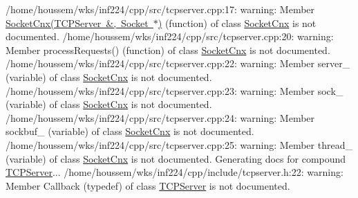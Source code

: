 /home/houssem/wks/inf224/cpp/src/tcpserver.cpp\+:17\+: warning\+: Member \mbox{\hyperlink{classSocketCnx}{Socket\+Cnx(\+TCPServer \&, Socket $\ast$)}} (function) of class \mbox{\hyperlink{classSocketCnx}{Socket\+Cnx}} is not documented. /home/houssem/wks/inf224/cpp/src/tcpserver.cpp\+:20\+: warning\+: Member process\+Requests() (function) of class \mbox{\hyperlink{classSocketCnx}{Socket\+Cnx}} is not documented. /home/houssem/wks/inf224/cpp/src/tcpserver.cpp\+:22\+: warning\+: Member server\+\_\+ (variable) of class \mbox{\hyperlink{classSocketCnx}{Socket\+Cnx}} is not documented. /home/houssem/wks/inf224/cpp/src/tcpserver.cpp\+:23\+: warning\+: Member sock\+\_\+ (variable) of class \mbox{\hyperlink{classSocketCnx}{Socket\+Cnx}} is not documented. /home/houssem/wks/inf224/cpp/src/tcpserver.cpp\+:24\+: warning\+: Member sockbuf\+\_\+ (variable) of class \mbox{\hyperlink{classSocketCnx}{Socket\+Cnx}} is not documented. /home/houssem/wks/inf224/cpp/src/tcpserver.cpp\+:25\+: warning\+: Member thread\+\_\+ (variable) of class \mbox{\hyperlink{classSocketCnx}{Socket\+Cnx}} is not documented. Generating docs for compound \mbox{\hyperlink{classTCPServer}{TCPServer}}... /home/houssem/wks/inf224/cpp/include/tcpserver.h\+:22\+: warning\+: Member Callback (typedef) of class \mbox{\hyperlink{classTCPServer}{TCPServer}} is not documented. 